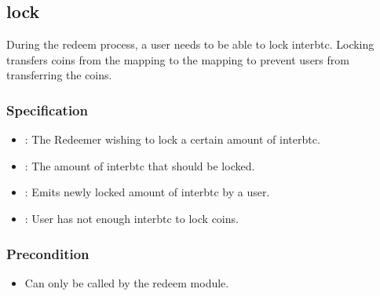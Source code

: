\documentclass[a4paper,10pt,english]{sphinxmanual}
\begin{document}
\subsection{lock}
\label{\detokenize{spec/treasury:lock}}\label{\detokenize{spec/treasury:id5}}
During the redeem process, a user needs to be able to lock interbtc. Locking transfers coins from the  mapping to the  mapping to prevent users from transferring the coins.


\subsubsection{Specification}
\label{\detokenize{spec/treasury:id6}}


\begin{itemize}
\item {} 
: The Redeemer wishing to lock a certain amount of interbtc.

\item {} 
: The amount of interbtc that should be locked.

\end{itemize}

\begin{itemize}
\item {} 
: Emits newly locked amount of interbtc by a user.

\end{itemize}

\begin{itemize}
\item {} 
: User has not enough interbtc to lock coins.

\end{itemize}


\subsubsection{Precondition}
\label{\detokenize{spec/treasury:precondition}}\begin{itemize}
\item {} 
Can only be called by the redeem module.

\end{itemize}
\end{document}
